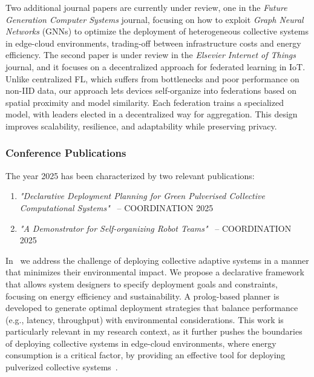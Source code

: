 \documentclass[runningheads]{llncs}
\begin{document}
Two additional journal papers are currently under review,
one in the \emph{Future Generation Computer Systems} journal,
focusing on how to exploit \emph{Graph Neural Networks} (GNNs) to optimize the deployment of heterogeneous collective systems in edge-cloud environments,
trading-off between infrastructure costs and energy efficiency.
%
The second paper is under review in the \emph{Elsevier Internet of Things} journal,
and it focuses on a decentralized approach for federated learning in IoT.
%
Unlike centralized FL,
which suffers from bottlenecks and poor performance on non-IID data,
our approach lets devices self-organize into federations based on spatial proximity and model similarity.
%
Each federation trains a specialized model,
with leaders elected in a decentralized way for aggregation.
%
This design improves scalability, resilience, and adaptability while preserving privacy.

\subsubsection{Conference Publications}

The year 2025 has been characterized by two relevant publications:

\begin{enumerate}
\item \textit{"Declarative Deployment Planning for Green Pulverised Collective Computational Systems"}~\cite{DBLP:conf/coordination/BrogiCFFV25} -- COORDINATION 2025 %
\item \textit{"A Demonstrator for Self-organizing Robot Teams"}~\cite{DBLP:conf/coordination/AguzziBBCCDFPV25} -- COORDINATION 2025 %
\end{enumerate}

In~\cite{DBLP:conf/coordination/BrogiCFFV25} we address the challenge of deploying collective adaptive systems in a manner that minimizes their environmental impact.
%
We propose a declarative framework that allows system designers to specify deployment goals and constraints, focusing on energy efficiency and sustainability.
%
A prolog-based planner is developed to generate optimal deployment strategies that balance performance (e.g., latency, throughput) with environmental considerations.
%
This work is particularly relevant in my research context,
as it further pushes the boundaries of deploying collective systems in edge-cloud environments,
where energy consumption is a critical factor,
by providing an effective tool for deploying pulverized collective systems~\cite{DBLP:journals/fgcs/FarabegoliPCV24,DBLP:journals/iot/FarabegoliPCV24,DBLP:conf/acsos/FarabegoliVC24}.
\end{document}
